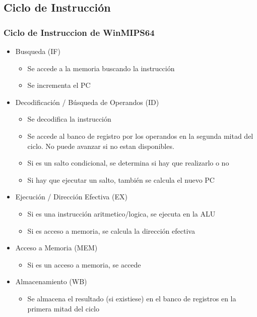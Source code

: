 \documentclass{beamer}
\begin{document}
\subsection{Ciclo de Instrucción}
\begin{frame}
\frametitle{Ciclo de Instruccion de WinMIPS64}
\begin{itemize}
\item Busqueda (IF)
\begin{itemize}
  \item Se accede a la memoria buscando la instrucción
  \item Se incrementa el PC
\end{itemize}
\item Decodificación / Búsqueda de Operandos (ID)
\begin{itemize}
  \item Se decodifica la instrucción
  \item Se accede al banco de registro por los operandos en la segunda mitad del ciclo. No puede avanzar si no estan disponibles.
  \item Si es un salto condicional, se determina si hay que realizarlo o no
  \item Si hay que ejecutar un salto, también se calcula el nuevo PC
\end{itemize}
\item Ejecución / Dirección Efectiva (EX)
\begin{itemize}
  \item Si es una instrucción aritmetico/logica, se ejecuta en la ALU
  \item Si es acceso a memoria, se calcula la dirección efectiva
\end{itemize}
\item Acceso a Memoria (MEM)
\begin{itemize}
  \item Si es un acceso a memoria, se accede
\end{itemize}
\item Almacenamiento (WB)
\begin{itemize}
  \item Se almacena el resultado (si existiese) en el banco de registros en la primera mitad del ciclo
\end{itemize}
\end{itemize}
\end{frame}
\end{document}
